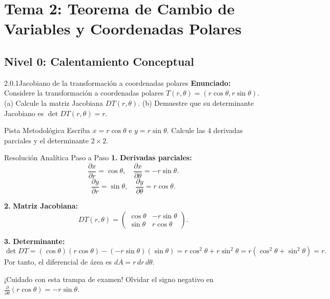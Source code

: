 \documentclass[11pt,a4paper]{article}
\begin{document}
\section{Tema 2: Teorema de Cambio de Variables y Coordenadas Polares}

\subsection{Nivel 0: Calentamiento Conceptual}

\begin{nivelbox}{2.0.1}{Jacobiano de la transformación a coordenadas polares}
\textbf{Enunciado:}\\
Considere la transformación a coordenadas polares $T(r, \theta) = (r\cos\theta, r\sin\theta)$.
(a) Calcule la matriz Jacobiana $DT(r, \theta)$.
(b) Demuestre que su determinante Jacobiano es $\det DT(r, \theta) = r$.

\begin{observacionbox}{Pista Metodológica}
Escriba $x = r\cos\theta$ e $y = r\sin\theta$. Calcule las 4 derivadas parciales y el determinante $2 \times 2$.
\end{observacionbox}

\begin{ejerciciobox}{Resolución Analítica Paso a Paso}
\smallskip\noindent\textbf{1.} \textbf{Derivadas parciales:}
\[\frac{\partial x}{\partial r} = \cos\theta, \quad \frac{\partial x}{\partial \theta} = -r\sin\theta.\]
\[\frac{\partial y}{\partial r} = \sin\theta, \quad \frac{\partial y}{\partial \theta} = r\cos\theta.\]

\smallskip\noindent\textbf{2.} \textbf{Matriz Jacobiana:}
\[DT(r,\theta) = \begin{pmatrix} \cos\theta & -r\sin\theta \\ \sin\theta & r\cos\theta \end{pmatrix}.\]

\smallskip\noindent\textbf{3.} \textbf{Determinante:}
\[\det DT = (\cos\theta)(r\cos\theta) - (-r\sin\theta)(\sin\theta) = r\cos^2\theta + r\sin^2\theta = r(\cos^2\theta + \sin^2\theta) = r.\]
Por tanto, el diferencial de área es $dA = r \, dr \, d\theta$.
\end{ejerciciobox}

\begin{errorbox}{¡Cuidado con esta trampa de examen!}
Olvidar el signo negativo en $\frac{\partial}{\partial \theta}(r\cos\theta) = -r\sin\theta$.
\end{errorbox}
\end{nivelbox}
\bigskip
\end{document}

